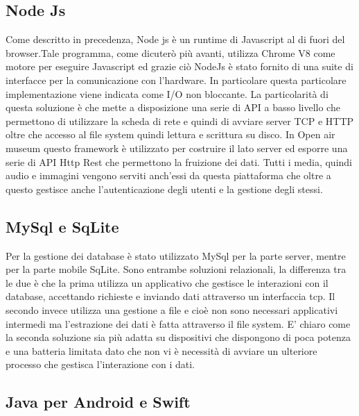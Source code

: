 \subsection{Node Js}\vspace{5mm}

	Come descritto in precedenza, Node js è un runtime di Javascript al di fuori del browser.Tale programma, come dicuterò più avanti, utilizza Chrome V8\cite{V8} come motore per eseguire Javascript ed grazie ciò NodeJs è stato fornito di una suite di interfacce per la comunicazione con l'hardware. In particolare questa particolare implementazione viene indicata come I/O non bloccante\cite{AsincIO}. La particolarità di questa soluzione è che mette a disposizione una serie di API a basso livello che permettono di utilizzare la scheda di rete e quindi di avviare server TCP e HTTP oltre che accesso al file system quindi lettura e scrittura su disco. In Open air museum questo framework è utilizzato per costruire il lato server ed esporre una serie di API Http Rest che permettono la fruizione dei dati. Tutti i media, quindi audio e immagini vengono serviti anch’essi da questa piattaforma che oltre a questo gestisce anche l’autenticazione degli utenti e la gestione degli stessi. \vspace{5mm}
	
	\subsection{MySql e SqLite}\vspace{5mm}
	
	Per la gestione dei database è stato utilizzato MySql per la parte server, mentre per la parte mobile SqLite. Sono entrambe soluzioni relazionali, la differenza tra le due è che la prima utilizza un applicativo che gestisce le interazioni con il database, accettando richieste e inviando dati attraverso un interfaccia tcp. Il secondo invece utilizza una gestione a file e cioè non sono necessari applicativi intermedi ma l'estrazione dei dati è fatta attraverso il file system. E' chiaro come la seconda soluzione sia più adatta su dispositivi che dispongono di poca potenza e una batteria limitata dato che non vi è necessità di avviare un ulteriore processo che gestisca l'interazione con i dati.
	
	\subsection{Java per Android e Swift}\vspace{5mm}
	

